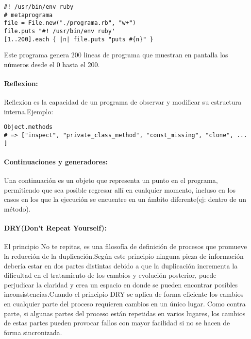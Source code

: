 \begin{verbatim}
#! /usr/bin/env ruby
# metaprograma
file = File.new("./programa.rb", "w+")
file.puts "#! /usr/bin/env ruby'
[1..200].each { |n| file.puts "puts #{n}" }
\end{verbatim}

Este programa genera 200 lineas de programa que muestran en pantalla los números desde el 0 hasta el 200.

\paragraph{Reflexion:}
Reflexion es la capacidad de un programa de observar y modificar su estructura interna.\newline Ejemplo:

\begin{verbatim}
Object.methods
# => ["inspect", "private_class_method", "const_missing", "clone", ... ]
\end{verbatim}

\paragraph{Continuaciones y generadores:}
Una continuación es un objeto que representa un punto en el programa, permitiendo que sea posible regresar allí en cualquier momento, incluso en los casos en los que la ejecución se encuentre en un ámbito diferente(ej: dentro de un método).

\paragraph{DRY(Don't Repeat Yourself):}
El principio No te repitas, es una filosofía de definición de procesos que promueve la reducción de la duplicación.\newline Según este principio ninguna pieza de información debería estar en dos partes distintas debido a que la duplicación incrementa la dificultad en el tratamiento de los cambios y evolución posterior, puede perjudicar la claridad y crea un espacio en donde se pueden encontrar posibles inconsistencias.\newline Cuando el principio DRY se aplica de forma eficiente los cambios en cualquier parte del proceso requieren cambios en un único lugar. Como contra parte, si algunas partes del proceso están repetidas en varios lugares, los cambios de estas partes pueden provocar fallos con mayor facilidad si no se hacen de forma sincronizada.

